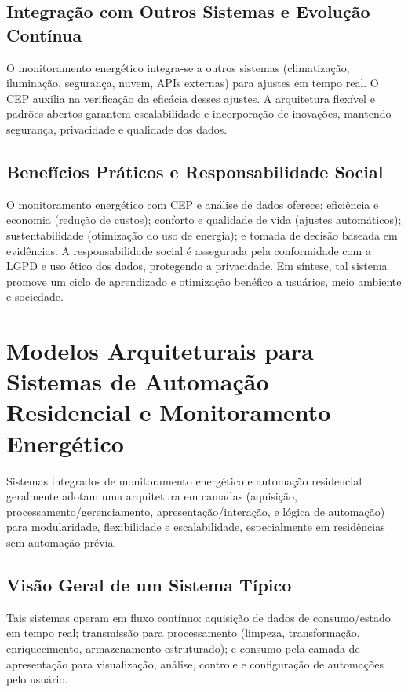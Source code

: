 \subsection{Integração com Outros Sistemas e Evolução Contínua}
O monitoramento energético integra-se a outros sistemas (climatização, iluminação, segurança, nuvem, APIs externas) para ajustes em tempo real. O CEP auxilia na verificação da eficácia desses ajustes. A arquitetura flexível e padrões abertos garantem escalabilidade e incorporação de inovações, mantendo segurança, privacidade e qualidade dos dados.
\subsection{Benefícios Práticos e Responsabilidade Social}
O monitoramento energético com CEP e análise de dados oferece: eficiência e economia (redução de custos); conforto e qualidade de vida (ajustes automáticos); sustentabilidade (otimização do uso de energia); e tomada de decisão baseada em evidências. A responsabilidade social é assegurada pela conformidade com a LGPD e uso ético dos dados, protegendo a privacidade. Em síntese, tal sistema promove um ciclo de aprendizado e otimização benéfico a usuários, meio ambiente e sociedade.

\section[Modelos de Arquitetura para Automação]{Modelos Arquiteturais para Sistemas de Automação Residencial e Monitoramento Energético}
\label{sec:modelos_arquiteturais}
Sistemas integrados de monitoramento energético e automação residencial geralmente adotam uma arquitetura em camadas (aquisição, processamento/gerenciamento, apresentação/interação, e lógica de automação) para modularidade, flexibilidade e escalabilidade, especialmente em residências sem automação prévia.

\subsection{Visão Geral de um Sistema Típico}
Tais sistemas operam em fluxo contínuo: aquisição de dados de consumo/estado em tempo real; transmissão para processamento (limpeza, transformação, enriquecimento, armazenamento estruturado); e consumo pela camada de apresentação para visualização, análise, controle e configuração de automações pelo usuário.

